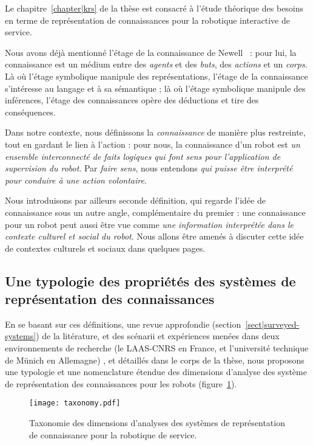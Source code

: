 Le chapitre~\ref{chapter|krs} de la thèse est consacré à l'étude théorique des
besoins en terme de représentation de connaissances pour la robotique
interactive de service.

Nous avons déjà mentionné \og l'étage de la connaissance \fg de
Newell~\cite{Newell1981} : pour lui, la connaissance est un médium entre des
\emph{agents} et des \emph{buts}, des \emph{actions} et un \emph{corps}. Là où
l'étage symbolique manipule des représentations, l'étage de la connaissance
s'intéresse au langage et à sa sémantique ; là où l'étage symbolique manipule
des inférences, l'étage des connaissances opère des déductions et tire des
conséquences.

Dans notre contexte, nous définissons la \emph{connaissance} de manière plus
restreinte, tout en gardant le lien à l'action : pour nous, la connaissance
d'un robot est \emph{un ensemble interconnecté de faits logiques qui font sens
pour l'application de supervision du robot}. Par \emph{faire sens}, nous
entendons \emph{qui puisse être interprété pour conduire à une action
volontaire}.

Nous introduisons par ailleurs seconde définition, qui regarde l'idée de
connaissance sous un autre angle, complémentaire du premier : une connaissance
pour un robot peut aussi être vue comme \emph{une information interprétée dans
le contexte culturel et social du robot}. Nous allons être amenés à discuter
cette idée de contextes culturels et sociaux dans quelques pages.

\subsection{Une typologie des propriétés des systèmes de représentation des connaissances}

En se basant sur ces définitions, une revue approfondie
(section~\ref{sect|surveyed-systems}) de la litérature, et des scénarii et
expériences menées dans deux environnements de recherche (le LAAS-CNRS en
France, et l'université technique de Münich en Allemagne) , et détaillés dans
le corps de la thèse, nous proposons une typologie et une nomenclature étendue
des dimensions d'analyse des système de représentation des connaissances pour
les robots (figure~\ref{fig|taxo}).

\begin{figure}
        \centering
        \texttt{[image: taxonomy.pdf]}
        \caption{Taxonomie des dimensions d'analyses des systèmes de 
        représentation de connaissance pour la robotique de service.}
        \label{fig|taxo}
\end{figure}

